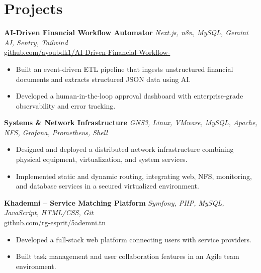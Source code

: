 \documentclass[a4paper,10pt]{article}
\begin{document}
\section*{Projects}

\textbf{AI-Driven Financial Workflow Automator} \hfill \textit{Next.js, n8n, MySQL, Gemini AI, Sentry, Tailwind} \\
\href{https://github.com/ayoubdk1/AI-Driven-Financial-Workflow-}{github.com/ayoubdk1/AI-Driven-Financial-Workflow-}
\begin{itemize}[noitemsep, topsep=2pt]
    \item Built an event-driven ETL pipeline that ingests unstructured financial documents and extracts structured JSON data using AI.
    \item Developed a human-in-the-loop approval dashboard with enterprise-grade observability and error tracking.
\end{itemize}

\vspace{4pt}

\textbf{Systems \& Network Infrastructure} \hfill \textit{GNS3, Linux, VMware, MySQL, Apache, NFS, Grafana, Prometheus, Shell}
\begin{itemize}[noitemsep, topsep=2pt]
    \item Designed and deployed a distributed network infrastructure combining physical equipment, virtualization, and system services.
    \item Implemented static and dynamic routing, integrating web, NFS, monitoring, and database services in a secured virtualized environment.
\end{itemize}

\vspace{4pt}

\textbf{Khademni -- Service Matching Platform} \hfill \textit{Symfony, PHP, MySQL, JavaScript, HTML/CSS, Git} \\
\href{https://github.com/rg-esprit/5ademni.tn}{github.com/rg-esprit/5ademni.tn}
\begin{itemize}[noitemsep, topsep=2pt]
    \item Developed a full-stack web platform connecting users with service providers.
    \item Built task management and user collaboration features in an Agile team environment.
\end{itemize}
\end{document}
